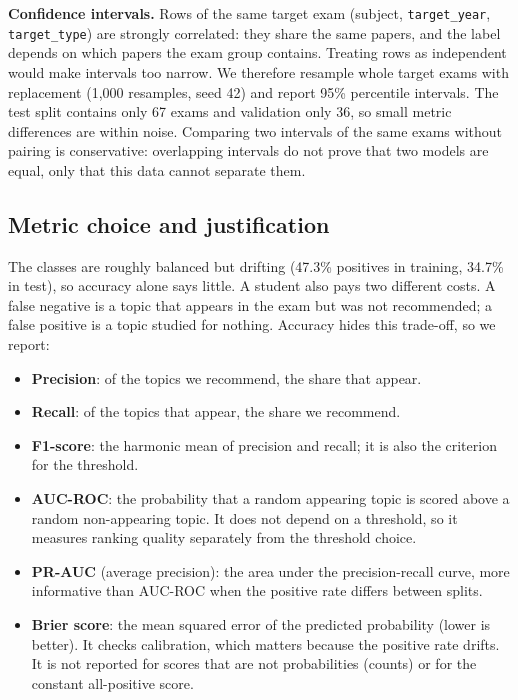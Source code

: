 \documentclass[11pt,a4paper]{article}
\newcommand{\auc}{AUC-ROC}
\begin{document}
\textbf{Confidence intervals.} Rows of the same target exam (subject, \texttt{target\_year}, \texttt{target\_type}) are
strongly correlated: they share the same papers, and the label depends on which papers the exam group contains. Treating
rows as independent would make intervals too narrow. We therefore resample whole target exams with replacement (1{,}000
resamples, seed 42) and report 95\% percentile intervals. The test split contains only 67 exams and validation only 36,
so small metric differences are within noise. Comparing two intervals of the same exams without pairing is conservative:
overlapping intervals do not prove that two models are equal, only that this data cannot separate them.

\subsection{Metric choice and justification}
\label{sec:metrics}
The classes are roughly balanced but drifting (47.3\% positives in training, 34.7\% in test), so accuracy alone says
little. A student also pays two different costs. A false negative is a topic that appears in the exam but was not
recommended; a false positive is a topic studied for nothing. Accuracy hides this trade-off, so we report:
\begin{itemize}
\item \textbf{Precision}: of the topics we recommend, the share that appear.
\item \textbf{Recall}: of the topics that appear, the share we recommend.
\item \textbf{F1-score}: the harmonic mean of precision and recall; it is also the criterion for the threshold.
\item \textbf{AUC-ROC}: the probability that a random appearing topic is scored above a random non-appearing topic. It
does not depend on a threshold, so it measures ranking quality separately from the threshold choice.
\item \textbf{PR-AUC} (average precision): the area under the precision-recall curve, more informative than \auc{} when
the positive rate differs between splits.
\item \textbf{Brier score}: the mean squared error of the predicted probability (lower is better). It checks calibration,
which matters because the positive rate drifts. It is not reported for scores that are not probabilities (counts) or for
the constant all-positive score.
\end{itemize}
\end{document}
